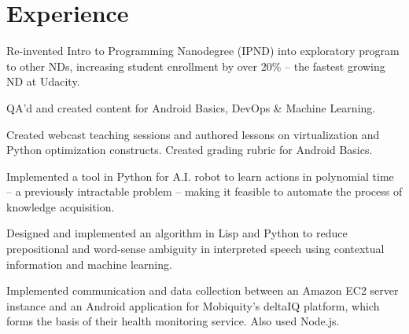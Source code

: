 \documentclass[]{deedy-resume-openfont}
\begin{document}
\hfill
\begin{minipage}[t]{0.66\textwidth} 


\section{Experience}

\vspace{\topsep} %
\begin{tightemize}


\item Re-invented Intro to Programming Nanodegree (IPND) into exploratory program to other NDs, increasing student enrollment by over 20\% -- the fastest growing ND at Udacity.

\item QA'd and created content for Android Basics, DevOps \& Machine Learning.

\item Created webcast teaching sessions and authored lessons on virtualization and Python optimization constructs. Created grading rubric for Android Basics.

\end{tightemize}
\sectionsep

\begin{tightemize}
\item Implemented a tool in Python for A.I. robot to learn actions in polynomial time -- a previously intractable problem -- making it feasible to automate the process of knowledge acquisition.

\item Designed and implemented an algorithm in Lisp and Python to reduce prepositional and word-sense ambiguity in interpreted speech using contextual information and machine learning.
\end{tightemize}
\sectionsep

\begin{tightemize}
\item Implemented communication and data collection between an Amazon EC2 server instance and an Android application for Mobiquity’s deltaIQ platform, which forms the basis of their health monitoring service. Also used Node.js.


\end{tightemize}
\end{minipage}
\end{document}
